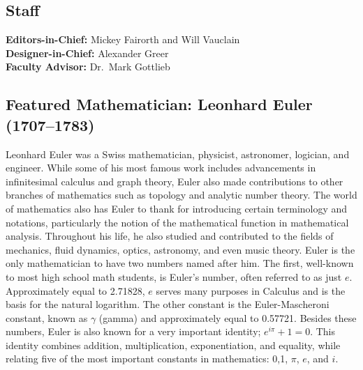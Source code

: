 \documentclass[12pt]{article}
\begin{document}
\subsection*{Staff}
{\centering{}
    \textbf{Editors-in-Chief:} Mickey Fairorth and Will Vauclain
    \\
    \textbf{Designer-in-Chief:} Alexander Greer
    \\
    \textbf{Faculty Advisor:} Dr.\ Mark Gottlieb
    \\}
\subsection*{Featured Mathematician: Leonhard Euler (1707--1783)}
Leonhard Euler was a Swiss mathematician, physicist, astronomer, logician, and engineer. While some of his most famous work includes advancements in infinitesimal calculus and graph theory, Euler also made contributions to other branches of mathematics such as topology and analytic number theory. The world of mathematics also has Euler to thank for introducing certain terminology and notations, particularly the notion of the mathematical function in mathematical analysis. Throughout his life, he also studied and contributed to the fields of mechanics, fluid dynamics, optics, astronomy, and even music theory.
Euler is the only mathematician to have two numbers named after him. The first, well-known to most high school math students, is Euler’s number, often referred to as just \(e\). Approximately equal to 2.71828, \(e\) serves many purposes in Calculus and is the basis for the natural logarithm. The other constant is the Euler-Mascheroni constant, known as \(\gamma{}\) (gamma) and approximately equal to 0.57721. Besides these numbers, Euler is also known for a very important identity; \(e^{i\pi} + 1 = 0\). This identity combines addition, multiplication, exponentiation, and equality, while relating five of the most important constants in mathematics: 0,1, \(\pi{}\), \(e\), and \(i\).
\newpage


\def\currentTitleWallpaper{Pure_Math_Border_Title.pdf}



\newpage



\newpage
\end{document}
